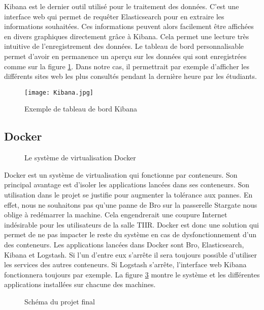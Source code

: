 Kibana est le dernier outil utilisé pour le traitement des données. C'est une interface web qui permet de requêter Elasticsearch pour en extraire les informations souhaitées. Ces informations peuvent alors facilement être affichées en divers graphiques directement grâce à Kibana. Cela permet une lecture très intuitive de l'enregistrement des données. Le tableau de bord personnalisable permet d'avoir en permanence un aperçu sur les données qui sont enregistrées comme sur la figure \ref{kibana}. Dans notre cas, il permettrait par exemple d'afficher les différents sites web les plus consultés pendant la dernière heure par les étudiants.

\begin{figure}[!h]
\centering
\texttt{[image: Kibana.jpg]}
\caption{Exemple de tableau de bord Kibana}
\label{kibana}
\end{figure}

\subsection{Docker}

\begin{figure}[!h]
\centering
\def\svgwidth{0.5\columnwidth}

\caption{Le système de virtualisation Docker}
\label{docker}
\end{figure}

Docker est un système de virtualisation qui fonctionne par conteneurs. Son principal avantage est d'isoler les applications lancées dans ses conteneurs. Son utilisation dans le projet se justifie pour augmenter la tolérance aux pannes. En effet, nous ne souhaitons pas qu'une panne de Bro sur la passerelle Stargate nous oblige à redémarrer la machine. Cela engendrerait une coupure Internet indésirable pour les utilisateurs de la salle TIIR. Docker est donc une solution qui permet de ne pas impacter le reste du système en cas de dysfonctionnement d'un des conteneurs. Les applications lancées dans Docker sont Bro, Elasticsearch, Kibana et Logstash. Si l'un d'entre eux s'arrête il sera toujours possible d'utiliser les services des autres conteneurs. Si Logstash s'arrête, l'interface web Kibana fonctionnera toujours par exemple. La figure \ref{projet_final} montre le système et les différentes applications installées sur chacune des machines.

\begin{figure}[!h]
\centering
\def\svgwidth{\columnwidth}

\caption{Schéma du projet final}
\label{projet_final}
\end{figure}


